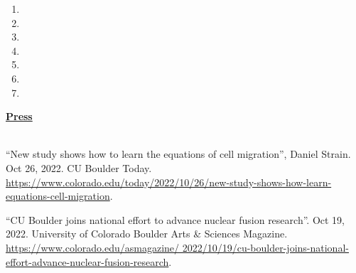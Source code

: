 \documentclass[letterpaper,11pt,oneside]{article}
\newcommand{\headr}[1]{\vspace{10pt}\uline{\Large{\textbf{#1}} \hfill } \\ \vspace{-10pt}\\}
\begin{document}
\begin{enumerate}
\item {}
\item {}
\item {}
\item {}
\item {}
\item {}
\item {}
\end{enumerate}

\headr{Press}
\begin{sloppypar}
\begin{enumerate}[label={[\arabic*]}]
\item \raggedright``New study shows how to learn the equations of cell migration'', Daniel Strain. Oct 26, 2022. CU Boulder Today. \url{https://www.colorado.edu/today/2022/10/26/new-study-shows-how-learn-equations-cell-migration}.
\item 
``CU Boulder joins national effort to advance nuclear fusion research''. Oct 19, 2022. University of Colorado Boulder Arts \& Sciences Magazine. \url{https://www.colorado.edu/asmagazine/
2022/10/19/cu-boulder-joins-national-effort-advance-nuclear-fusion-research}.
\end{enumerate}
\end{sloppypar}

\end{document}
